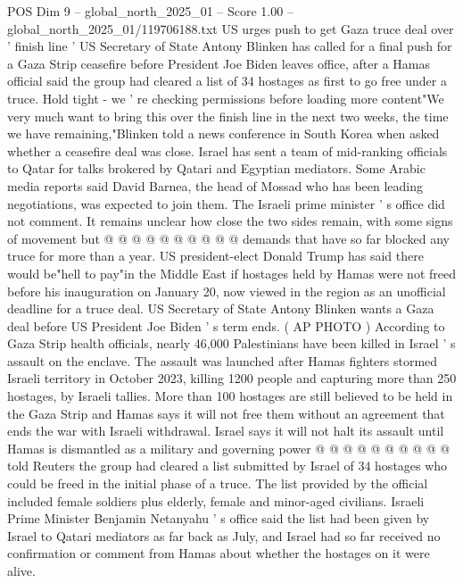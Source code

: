 \begin{textsample}{POS Dim 9 – global\_north\_2025\_01 – Score 1.00 – global\_north\_2025\_01/119706188.txt}  \label{ex:f9_pos_358}
US urges push to get Gaza truce deal over ' finish line ' US Secretary of State Antony Blinken has called for a final push for a Gaza Strip ceasefire before President Joe Biden leaves office, after a Hamas official said the group had cleared a list of 34 hostages as first to go free under a truce.
Hold tight - we ' re checking permissions before loading more content"We very much want to bring this over the finish line in the next two weeks, the time we have remaining,"Blinken told a news conference in South Korea when asked whether a ceasefire deal was close.
Israel has sent a team of mid-ranking officials to Qatar for talks brokered by Qatari and Egyptian mediators.
Some Arabic media reports said David Barnea, the head of Mossad who has been leading negotiations, was expected to join them.
The Israeli prime minister ' s office did not comment.
It remains unclear how close the two sides remain, with some signs of movement but @ @ @ @ @ @ @ @ @ @ demands that have so far blocked any truce for more than a year.
US president-elect Donald Trump has said there would be"hell to pay"in the Middle East if hostages held by Hamas were not freed before his inauguration on January 20, now viewed in the region as an unofficial deadline for a truce deal.
US Secretary of State Antony Blinken wants a Gaza deal before US President Joe Biden ' s term ends. ( AP PHOTO ) According to Gaza Strip health officials, nearly 46,000 Palestinians have been killed in Israel ' s assault on the enclave.
The assault was launched after Hamas fighters stormed Israeli territory in October 2023, killing 1200 people and capturing more than 250 hostages, by Israeli tallies.
More than 100 hostages are still believed to be held in the Gaza Strip and Hamas says it will not free them without an agreement that ends the war with Israeli withdrawal.
Israel says it will not halt its assault until Hamas is dismantled as a military and governing power @ @ @ @ @ @ @ @ @ @ told Reuters the group had cleared a list submitted by Israel of 34 hostages who could be freed in the initial phase of a truce.
The list provided by the official included female soldiers plus elderly, female and minor-aged civilians.
Israeli Prime Minister Benjamin Netanyahu ' s office said the list had been given by Israel to Qatari mediators as far back as July, and Israel had so far received no confirmation or comment from Hamas about whether the hostages on it were alive.

\end{textsample}
